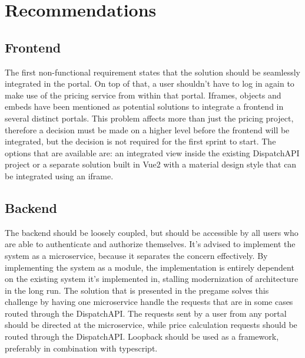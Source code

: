 \graphicspath{{Chapter8/Figs/Vector/}{Chapter8/Figs/}}

%
\chapter{Recommendations}

\section{Frontend}
The first non-functional requirement states that the solution should be seamlessly integrated in the portal. On top of that, a user shouldn’t have to log in again to make use of the pricing service from within that portal. Iframes, objects and embeds have been mentioned as potential solutions to integrate a frontend in several distinct portals. This problem affects more than just the pricing project, therefore a decision must be made on a higher level before the frontend will be integrated, but the decision is not required for the first sprint to start. The options that are available are: an integrated view inside the existing DispatchAPI project or a separate solution built in Vue2 with a material design style that can be integrated using an iframe.

\section{Backend}
The backend should be loosely coupled, but should be accessible by all users who are able to authenticate and authorize themselves. It’s advised to implement the system as a microservice, because it separates the concern effectively. By implementing the system as a module, the implementation is entirely dependent on the existing system it’s implemented in, stalling modernization of architecture in the long run. The solution that is presented in the pregame solves this challenge by having one microservice handle the requests that are in some cases routed through the DispatchAPI. The requests sent by a user from any portal should be directed at the microservice, while price calculation requests should be routed through the DispatchAPI. Loopback should be used as a framework, preferably in combination with typescript.

